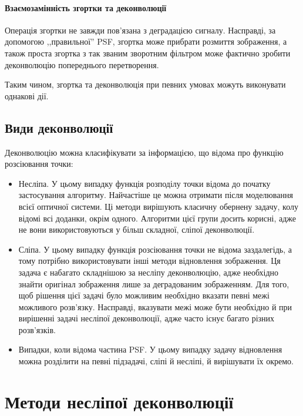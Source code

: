 \documentclass{diploma}
\begin{document}
      \paragraph{Взаємозамінність згортки та деконволюції}
        Операція згортки не завжди пов’язана з деградацією сигналу.
        Насправді, за допомогою ,,правильної'' PSF, згортка може прибрати розмиття
        зображення, а також проста згортка з так званим зворотним фільтром
        може фактично зробити деконволюцію попереднього перетворення.

        Таким чином, згортка та деконволюція при певних умовах можуть виконувати
        однакові дії.
      \clearpage
    \subsection{Види деконволюції}
      Деконволюцію можна класифікувати за інформацією, що відома про функцію
      розсіювання точки:
      \begin{itemize}
        \item Несліпа.
          У цьому випадку функція розподілу точки відома до початку
          застосування алгоритму.
          Найчастіше це можна отримати після моделювання всієї оптичної
          системи.
          Ці методи вирішують класичну обернену задачу, колу відомі всі
          доданки, окрім одного.
          Алгоритми цієї групи досить корисні, адже не вони використовуються у
          більш складної, сліпої деконволюції.
        \item Сліпа.
          У цьому випадку функція розсіювання точки не відома заздалегідь, а
          тому потрібно використовувати інші методи відновлення зображення.
          Ця задача є набагато складнішою за несліпу деконволюцію, адже
          необхідно знайти оригінал зображення лише за деградованим зображенням.
          Для того, щоб рішення цієї задачі було можливим необхідно вказати
          певні межі можливого розв’язку.
          Насправді, вказувати межі може бути необхідно й при вирішенні задачі
          несліпої деконволюції, адже часто існує багато різних розв’язків.
        \item Випадки, коли відома частина PSF.
          У цьому випадку задачу відновлення можна розділити на певні
          підзадачі, сліпі й несліпі, й вирішувати їх окремо.
      \end{itemize}
      \clearpage
  \section{Методи несліпої деконволюції}
\end{document}
